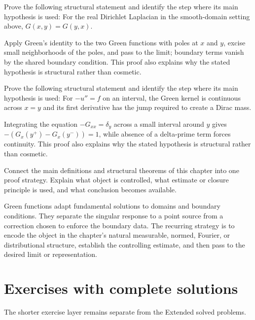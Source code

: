 \begin{problem}\label{prob:iii25-problem-10}
Prove the following structural statement and identify the step where its main hypothesis is used: For the real Dirichlet Laplacian in the smooth-domain setting above, $G(x,y)=G(y,x)$.
\end{problem}
\begin{solution}
Apply Green's identity to the two Green functions with poles at $x$ and $y$, excise small neighborhoods of the poles, and pass to the limit; boundary terms vanish by the shared boundary condition. This proof also explains why the stated hypothesis is structural rather than cosmetic.
\end{solution}

\begin{problem}\label{prob:iii25-problem-11}
Prove the following structural statement and identify the step where its main hypothesis is used: For $-u''=f$ on an interval, the Green kernel is continuous across $x=y$ and its first derivative has the jump required to create a Dirac mass.
\end{problem}
\begin{solution}
Integrating the equation $-G_{xx}=\delta_y$ across a small interval around $y$ gives $-(G_x(y^+)-G_x(y^-))=1$, while absence of a delta-prime term forces continuity. This proof also explains why the stated hypothesis is structural rather than cosmetic.
\end{solution}

\begin{problem}\label{prob:iii25-problem-12}
Connect the main definitions and structural theorems of this chapter into one proof strategy. Explain what object is controlled, what estimate or closure principle is used, and what conclusion becomes available.
\end{problem}
\begin{solution}
Green functions adapt fundamental solutions to domains and boundary conditions. They separate the singular response to a point source from a correction chosen to enforce the boundary data. The recurring strategy is to encode the object in the chapter's natural measurable, normed, Fourier, or distributional structure, establish the controlling estimate, and then pass to the desired limit or representation.
\end{solution}
\section{Exercises with complete solutions}
The shorter exercise layer remains separate from the Extended solved problems.

